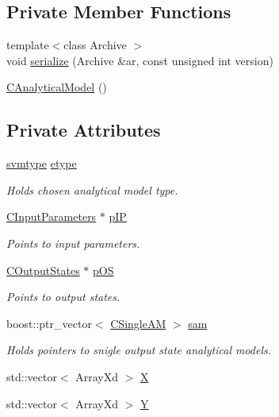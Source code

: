 \subsection*{Private Member Functions}
\begin{DoxyCompactItemize}
\item 
{\footnotesize template$<$class Archive $>$ }\\void \hyperlink{class_go_s_u_m_1_1_c_analytical_model_a4d60f0d24f726a626ba834215a90380d}{serialize} (Archive \&ar, const unsigned int version)
\item 
\hyperlink{class_go_s_u_m_1_1_c_analytical_model_a9b902a590c6a95d66cd9c65b9e941bb8}{C\-Analytical\-Model} ()
\end{DoxyCompactItemize}
\subsection*{Private Attributes}
\begin{DoxyCompactItemize}
\item 
\hyperlink{class_go_s_u_m_1_1_c_analytical_model_ad8bee3341d00a0c75e89c1a4376d6fbb}{svmtype} \hyperlink{class_go_s_u_m_1_1_c_analytical_model_acb4d7f4128a67445757b81c9d82a4ffe}{etype}
\begin{DoxyCompactList}\small\item\em Holds chosen analytical model type. \end{DoxyCompactList}\item 
\hyperlink{class_go_s_u_m_1_1_c_input_parameters}{C\-Input\-Parameters} $\ast$ \hyperlink{class_go_s_u_m_1_1_c_analytical_model_ad7743d89d391a77a3328db3497e800db}{p\-I\-P}
\begin{DoxyCompactList}\small\item\em Points to input parameters. \end{DoxyCompactList}\item 
\hyperlink{class_go_s_u_m_1_1_c_output_states}{C\-Output\-States} $\ast$ \hyperlink{class_go_s_u_m_1_1_c_analytical_model_adc7b8239bc679f97800d0165d15e83f0}{p\-O\-S}
\begin{DoxyCompactList}\small\item\em Points to output states. \end{DoxyCompactList}\item 
boost\-::ptr\-\_\-vector$<$ \hyperlink{class_go_s_u_m_1_1_c_single_a_m}{C\-Single\-A\-M} $>$ \hyperlink{class_go_s_u_m_1_1_c_analytical_model_a032842ab4f4464dbefed384088ed754e}{sam}
\begin{DoxyCompactList}\small\item\em Holds pointers to snigle output state analytical models. \end{DoxyCompactList}\item 
std\-::vector$<$ Array\-Xd $>$ \hyperlink{class_go_s_u_m_1_1_c_analytical_model_aebd4e3617cb5a88d6d3b3bca772cea10}{X}
\item 
std\-::vector$<$ Array\-Xd $>$ \hyperlink{class_go_s_u_m_1_1_c_analytical_model_ac5eeddbe5c0117e14768bc020b493709}{Y}
\end{DoxyCompactItemize}
